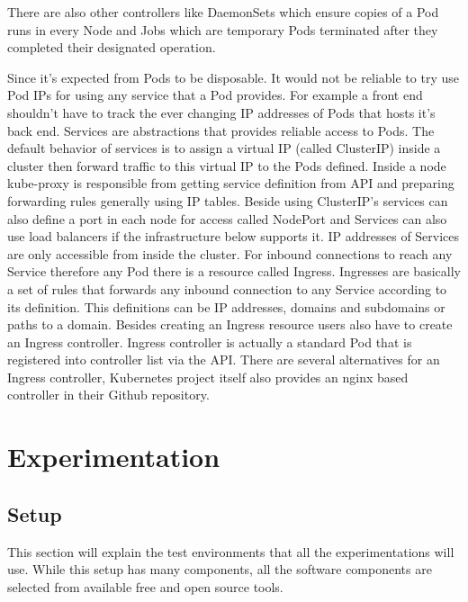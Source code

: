 \documentclass[12pt,oneandhalf,chaparabic,ceng,ms,eng,oneside,pntc]{gsufbe}
\begin{document}
There are also other controllers like DaemonSets which ensure copies of a Pod runs in every Node and
Jobs which are temporary Pods terminated after they completed their designated operation.

Since it’s expected from Pods to be disposable. It would not be reliable to try use Pod IPs for using
any service that a Pod provides. For example a front end shouldn’t have to track the ever changing IP
addresses of Pods that hosts it’s back end. Services are abstractions that provides reliable access to
Pods. The default behavior of services is to assign a virtual IP (called ClusterIP) inside a cluster
then forward traffic to this virtual IP to the Pods defined. Inside a node kube-proxy is responsible
from getting service definition from API and preparing forwarding rules generally using IP tables.
Beside using ClusterIP’s services can also define a port in each node for access called NodePort and
Services can also use load balancers if the infrastructure below supports it.
IP addresses of Services are only accessible from inside the cluster. For inbound connections to reach
any Service therefore any Pod there is a resource called Ingress. Ingresses are basically a set of rules
that forwards any inbound connection to any Service according to its definition. This definitions can
be IP addresses, domains and subdomains or paths to a domain. Besides creating an Ingress resource
users also have to create an Ingress controller. Ingress controller is actually a standard Pod that is
registered into controller list via the API. There are several alternatives for an Ingress controller,
Kubernetes project itself also provides an nginx based controller in their Github repository.


\chapter{Experimentation}
\section{Setup}
This section will explain the test environments that all the experimentations will use. While this
setup has many components, all the software components are selected from available free and open source
tools.
\end{document}
